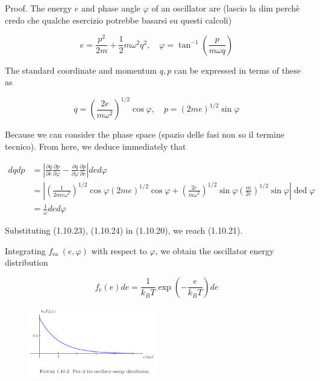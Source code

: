 \documentclass{article}
\begin{document}
Proof. The energy $e$ and phase angle $\varphi$ of an oscillator are (lascio la dim perchè credo che qualche esercizio potrebbe basarsi su questi calcoli)
 
\begin{equation*}
e=\frac{p^{2}}{2 m}+\frac{1}{2} m \omega^{2} q^{2}, \quad \varphi=\tan ^{-1}\left(\frac{p}{m \omega q}\right) \tag{1.10.22}
\end{equation*}
 

The standard coordinate and momentum $q, p$ can be expressed in terms of these as
 
\begin{equation*}
q=\left(\frac{2 e}{m \omega^{2}}\right)^{1 / 2} \cos \varphi, \quad p=(2 m e)^{1 / 2} \sin \varphi \tag{1.10.23}
\end{equation*}
 
Because we can consider the phase space (spazio delle fasi non so il termine tecnico).
From here, we deduce immediately that
 
\begin{align*}
d q d p & =\left|\frac{\partial q}{\partial e} \frac{\partial p}{\partial \varphi}-\frac{\partial q}{\partial \varphi} \frac{\partial p}{\partial e}\right| d e d \varphi  \tag{1.10.24}\\
& =\left|\left(\frac{1}{2 m e \omega^{2}}\right)^{1 / 2} \cos \varphi(2 m e)^{1 / 2} \cos \varphi+\left(\frac{2 e}{m \omega^{2}}\right)^{1 / 2} \sin \varphi\left(\frac{m}{2 e}\right)^{1 / 2} \sin \varphi\right| \operatorname{ded} \varphi \\
& =\frac{1}{\omega} d e d \varphi
\end{align*}
 

Substituting (1.10.23), (1.10.24) in (1.10.20), we reach (1.10.21).

Integrating $f_{\text {ea }}(e, \varphi)$ with respect to $\varphi$, we obtain the oscillator energy distribution
 
\begin{equation*}
f_{\mathrm{e}}(e) d e=\frac{1}{k_{B} T} \exp \left(-\frac{e}{k_{B} T}\right) d e \tag{1.10.25}
\end{equation*}
 

\begin{figure}[h!]
    \centering
    \includegraphics[width=0.5\textwidth]{pictures_1/fig 1.10.2.png}
    \label{fig:1.9.1}
\end{figure}
\end{document}
